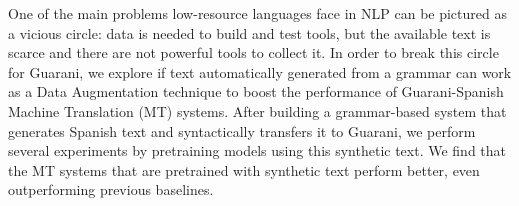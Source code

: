 One of the main problems low-resource languages face in NLP can be pictured as a vicious circle: data is needed to build and test tools, but the available text is scarce and there are not powerful tools to collect it. In order to break this circle for Guarani, we explore if text automatically generated from a grammar can work as a Data Augmentation technique to boost the performance of Guarani-Spanish Machine Translation (MT) systems. After building a grammar-based system that generates Spanish text and syntactically transfers it to Guarani, we perform several experiments by pretraining models using this synthetic text. We find that the MT systems that are pretrained with synthetic text perform better, even outperforming previous baselines.